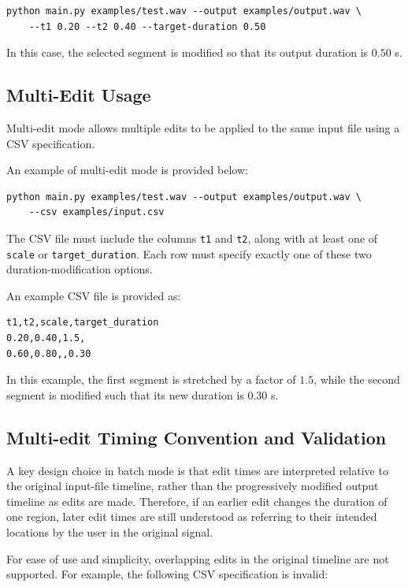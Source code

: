 \documentclass{article}
\begin{document}
\begin{verbatim}
python main.py examples/test.wav --output examples/output.wav \
    --t1 0.20 --t2 0.40 --target-duration 0.50
\end{verbatim}

In this case, the selected segment is modified so that its output duration is \(0.50\) s.

\subsection{Multi-Edit Usage}

Multi-edit mode allows multiple edits to be applied to the same input file using a CSV specification.

An example of multi-edit mode is provided below:

\begin{verbatim}
python main.py examples/test.wav --output examples/output.wav \
    --csv examples/input.csv
\end{verbatim}

The CSV file must include the columns \texttt{t1} and \texttt{t2}, along with at least one of \texttt{scale} or \texttt{target\_duration}. Each row must specify exactly one of these two duration-modification options.

An example CSV file is provided as:

\begin{verbatim}
t1,t2,scale,target_duration
0.20,0.40,1.5,
0.60,0.80,,0.30
\end{verbatim}

In this example, the first segment is stretched by a factor of \(1.5\), while the second segment is modified such that its new duration is \(0.30\) s.

\subsection{Multi-edit Timing Convention and Validation}

A key design choice in batch mode is that edit times are interpreted relative to the original input-file timeline, rather than the progressively modified output timeline as edits are made. Therefore, if an earlier edit changes the duration of one region, later edit times are still understood as referring to their intended locations by the user in the original signal.

For ease of use and simplicity, overlapping edits in the original timeline are not supported. For example, the following CSV specification is invalid:
\end{document}
